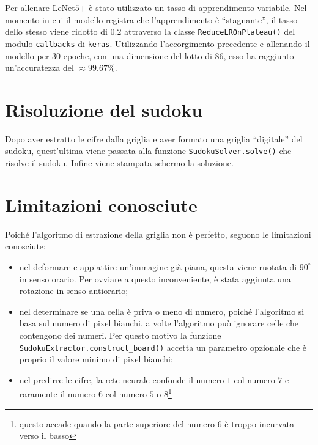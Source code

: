 \documentclass[a4paper, 10pt]{article}
\newcommand{\lenet}{LeNet\(5\)+}
\begin{document}
Per allenare \lenet{} è stato utilizzato un tasso di apprendimento variabile.
Nel momento in cui il modello registra che l'apprendimento è ``stagnante'', il
tasso dello stesso viene ridotto di \(0.2\) attraverso la classe
\texttt{ReduceLROnPlateau()} del modulo \texttt{callbacks}
di \texttt{keras}.
Utilizzando l'accorgimento precedente e allenando il modello per \(30\) epoche,
con una dimensione del lotto di \(86\), esso ha raggiunto un'accuratezza del
\(\approx 99.67\%\).

\section{Risoluzione del sudoku}

Dopo aver estratto le cifre dalla griglia e aver formato una griglia
``digitale'' del sudoku, quest'ultima viene passata alla funzione
\texttt{SudokuSolver.solve()} che risolve il sudoku. Infine viene
stampata schermo la soluzione.

\section{Limitazioni conosciute}

Poiché l'algoritmo di estrazione della griglia non è perfetto, seguono le
limitazioni conosciute:

\begin{itemize}
    \item nel deformare e appiattire un'immagine già piana, questa viene ruotata di \(90^\circ\) in senso orario. Per ovviare a questo inconveniente, è stata aggiunta una rotazione in senso antiorario;
    \item nel determinare se una cella è priva o meno di numero, poiché l'algoritmo si basa sul numero di pixel bianchi, a volte l'algoritmo può ignorare celle che contengono dei numeri. Per questo motivo la funzione \texttt{SudokuExtractor.construct_board()} accetta un parametro opzionale che è proprio il valore minimo di pixel bianchi;
    \item nel predirre le cifre, la rete neurale confonde il numero \(1\) col numero \(7\) e raramente il numero \(6\) col numero \(5\) o \(8\)\footnote{questo accade quando la parte superiore del numero \(6\) è troppo incurvata verso il basso}
\end{itemize}


\bigskip
\printbibliography
\end{document}

